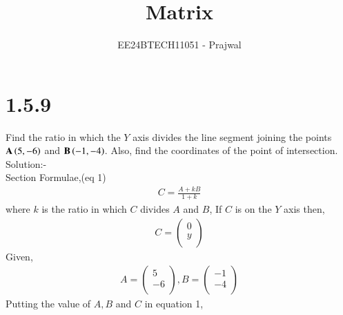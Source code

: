 \documentclass[journal]{IEEEtran}
\numberwithin{equation}{enumi}
\numberwithin{figure}{enumi}
\begin{document}

\title{Matrix}
\author{EE24BTECH11051 - Prajwal}
{\let\newpage\relax\maketitle}
\section{1.5.9}
Find the ratio in which the $Y$ axis divides the line segment joining the points $\mathbf{A}\left(5,-6\right)$ and $\mathbf{B}\left(-1,-4\right)$. Also, find the coordinates of the point of intersection.\\ 
Solution:-\\
Section Formulae,\hfill (eq 1)
 \begin{align*}
 C=\frac{A+kB}{1+k} 
 \end{align*}
 where $k$ is the ratio in which $C$ divides $A$ and $B$,
 If $C$ is on the $Y$ axis then,
 \begin{align*}
     C = \begin{pmatrix} 0 \\ y \\ \end{pmatrix}
 \end{align*}
 Given,
 \begin{align*}
 A = \begin{pmatrix} 5 \\ -6 \\ \end{pmatrix},
 B = \begin{pmatrix} -1 \\ -4 \\ \end{pmatrix}
 \end{align*}
 Putting the value of $A,B$ and $C$ in equation 1,
\end{document}
